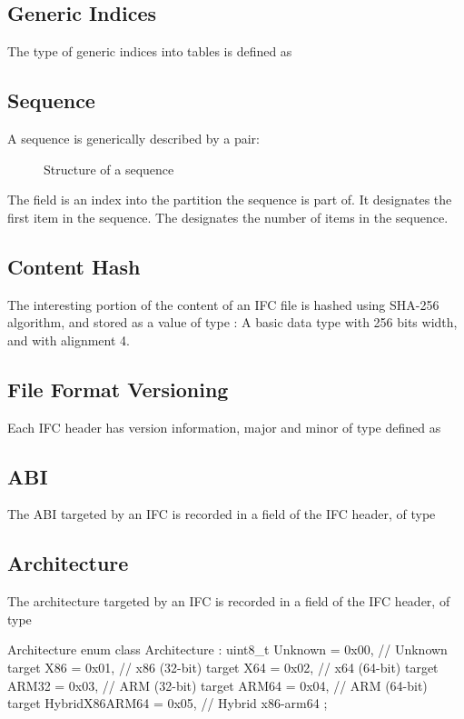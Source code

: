 \subsection{Generic Indices}
\label{sec:ifc-index-type}
The type of generic indices into tables is defined as 

\subsection{Sequence}
\label{sec:ifc-sequence}
A sequence is generically described by a pair:
%
\begin{figure}[H]
	\centering
	\caption{Structure of a sequence}
	\label{fig:ifc-sequence-structure}
\end{figure}
%
The  field is an index into the partition the sequence is part of.  It designates the first item in the sequence.
The  designates the number of items in the sequence.

\subsection{Content Hash}
\label{sec:content-sha256-hash}
The interesting portion of the content of an IFC file is hashed using SHA-256 algorithm, and stored as a value of type :
A basic data type with 256 bits width, and with alignment 4.

\subsection{File Format Versioning}
\label{sec:ifc-versioning-data-type}

Each IFC header has version information, major and minor of type defined as 

\subsection{ABI}
\label{sec:ifc-abi-data-type}
The ABI targeted by an IFC is recorded in a field of the IFC header, of type 

\subsection{Architecture}
\label{sec:ifc-architecture-data-type}
The architecture targeted by an IFC is recorded in a field of the IFC header, of type
\begin{typedef}{Architecture}{}
	enum class Architecture : uint8_t {
		Unknown	= 0x00,		// Unknown target
		X86			= 0x01,		// x86 (32-bit) target
		X64			= 0x02,		// x64 (64-bit) target
		ARM32		= 0x03,		// ARM (32-bit) target
		ARM64		= 0x04,		// ARM (64-bit) target
		HybridX86ARM64 = 0x05,	// Hybrid x86-arm64
	};
\end{typedef}

